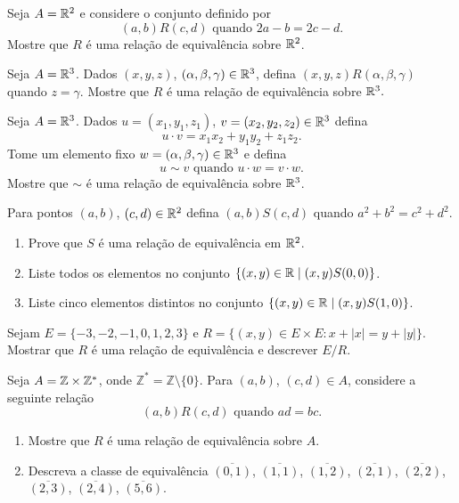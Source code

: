 \documentclass[12pt]{exam}
\begin{document}
    \vspace{.3cm}

    \questao{} Seja $A = \mathbb{R}^2$ e considere o conjunto definido por
    \[
      (a,b)R(c,d) \mbox{ quando } 2a - b = 2c - d.
    \]
    Mostre que $R$ \'e uma rela\c{c}\~ao de equival\^encia sobre $\mathbb{R}^2$.

    \vspace{.3cm}

    \questao{} Seja $A = \mathbb{R}^3$. Dados $(x, y, z)$, $(\alpha, \beta, \gamma) \in \mathbb{R}^3$, defina $(x, y, z) R (\alpha, \beta, \gamma)$ quando $z = \gamma$. Mostre que $R$ \'e uma rela\c{c}\~ao de equival\^encia sobre $\mathbb{R}^3.$

    \vspace{.3cm}

    \questao{} Seja $A = \mathbb{R}^3$. Dados $u = (x_1, y_1, z_1)$, $v = (x_2, y_2, z_2) \in \mathbb{R}^3$ defina
    \[
        u\cdot v = x_1x_2 + y_1y_2 + z_1z_2.
    \]
    Tome um elemento fixo $w = (\alpha, \beta, \gamma) \in \mathbb{R}^3$ e defina
    \[
        u \sim v \mbox{ quando } u \cdot w = v \cdot w.
    \]
    Mostre que $\sim$ \'e uma rela\c{c}\~ao de equival\^encia sobre $\mathbb{R}^3$.

    \vspace{.3cm}

    \questao{} Para pontos $(a, b)$, $(c, d) \in \mathbb{R}^2$ defina $(a, b) S (c, d)$ quando $a^2 + b^2 = c^2 + d^2$.
    \begin{enumerate}[label={\alph*})]
      \item Prove que $S$ \'e uma rela\c{c}\~ao de equival\^encia em $\mathbb{R}^2$.

      \item Liste todos os elementos no conjunto $\{(x, y) \in \mathbb{R} \mid (x, y) S (0, 0)\}$.

      \item Liste cinco elementos distintos no conjunto $\{(x, y) \in \mathbb{R} \mid (x, y) S (1, 0)\}$.
    \end{enumerate}

    \vspace{.3cm}

    \questao{} Sejam $E = \{-3, -2, -1, 0, 1, 2, 3\}$ e $R = \{(x, y) \in E \times E : x + |x| = y + |y|\}$. Mostrar que $R$ \'e uma rela\c{c}\~ao de equival\^encia e descrever $E/R$.

    \vspace{.3cm}

    \questao{} Seja $A = \mathbb{Z} \times \mathbb{Z}^*$, onde $\mathbb{Z}^* = \mathbb{Z} \setminus \{0\}$. Para $(a,b)$, $(c,d) \in A$, considere a seguinte rela{\c c}{\~a}o
    \[
        (a,b) R (c,d) \mbox{ quando } ad = bc.
    \]
    \begin{enumerate}[label={\alph*})]
        \item Mostre que $R$ {\'e} uma rela{\c c}{\~a}o de equival{\^e}ncia sobre $A$.

        \item Descreva a classe de equival{\^e}ncia $\overline{(0,1)}$, $\overline{(1,1)}$, $\overline{(1,2)}$, $\overline{(2,1)}$, $\overline{(2,2)}$, $\overline{(2,3)}$, $\overline{(2,4)}$, $\overline{(5,6)}$.
    \end{enumerate}
\end{document}
